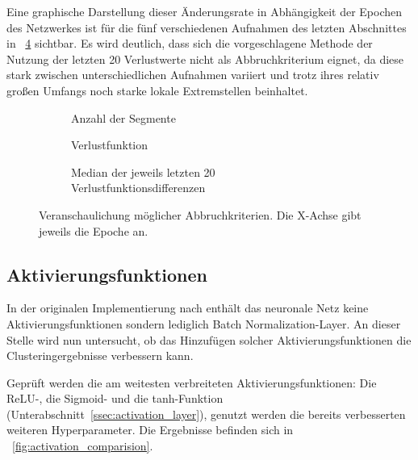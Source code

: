 Eine graphische Darstellung dieser Änderungsrate in Abhängigkeit der Epochen des Netzwerkes ist für die fünf verschiedenen Aufnahmen des letzten Abschnittes in \figurename~\ref{fig:stopping_criteria} sichtbar. Es wird deutlich, dass sich die vorgeschlagene Methode der Nutzung der letzten 20 Verlustwerte nicht als Abbruchkriterium eignet, da diese stark zwischen unterschiedlichen Aufnahmen variiert und trotz ihres relativ großen Umfangs noch starke lokale Extremstellen beinhaltet.

\begin{figure}[h!]
	\centering
	\begin{subfigure}[t]{0.32\textwidth}
		\centering
		
		\captionsetup{format=plain,width=0.85\textwidth}
		\caption{Anzahl der Segmente}
		\label{}
	\end{subfigure}
	\hfill
	\begin{subfigure}[t]{0.32\textwidth}
		\centering
		
		\captionsetup{format=plain,width=0.85\textwidth}
		\caption{Verlustfunktion}
		\label{}
	\end{subfigure}
	\hfill
	\begin{subfigure}[t]{0.32\textwidth}
		\centering
		
		\captionsetup{format=plain,width=0.85\textwidth}
		\caption{Median der jeweils letzten 20 Verlustfunktionsdifferenzen}
		\label{}
	\end{subfigure}
	\caption{Veranschaulichung möglicher Abbruchkriterien. Die X-Achse gibt jeweils die Epoche an.}
	\label{fig:stopping_criteria}
\end{figure}



\subsection{Aktivierungsfunktionen}
\label{ssec:network_architecture_activation}

In der originalen Implementierung nach \cite{kanezaki_18} enthält das neuronale Netz keine Aktivierungsfunktionen sondern lediglich Batch Normalization-Layer. An dieser Stelle wird nun untersucht, ob das Hinzufügen solcher Aktivierungsfunktionen die Clusteringergebnisse verbessern kann.

Geprüft werden die am weitesten verbreiteten Aktivierungsfunktionen: Die ReLU-, die Sigmoid- und die tanh-Funktion (\vgl Unterabschnitt~\ref{ssec:activation_layer}), genutzt werden die bereits verbesserten weiteren Hyperparameter. Die Ergebnisse befinden sich in \figurename~\ref{fig:activation_comparision}.

